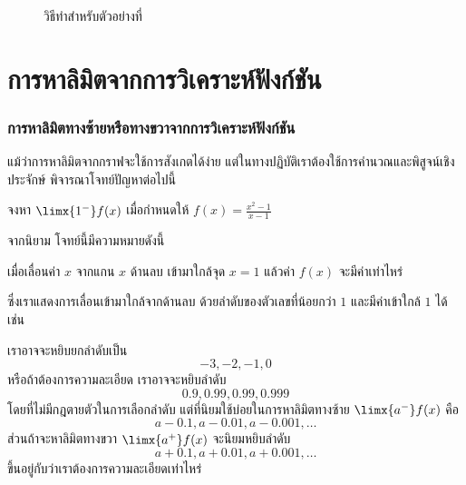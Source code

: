 \begin{frame}
\begin{figure}[h!]
\caption{วิธีทำสำหรับตัวอย่างที่ \theex}
\label{fig:limit_graph_ex3_sol}
\end{figure}
\end{frame}

\section[ลิมิตจากฟังก์ชัน]{การหาลิมิตจากการวิเคราะห์ฟังก์ชัน}
\frame{\sectionpage}

\begin{frame}[t]
\frametitle{การหาลิมิตทางซ้ายหรือทางขวาจากการวิเคราะห์ฟังก์ชัน}
แม้ว่าการหาลิมิตจากกราฟจะใช้การสังเกตได้ง่าย แต่ในทางปฏิบัติเราต้องใช้การคำนวณและพิสูจน์เชิงประจักษ์ พิจารณาโจทย์ปัญหาต่อไปนี้
\begin{remark}{}
\begin{center}
จงหา $\limx{1^{-}} f(x)$ เมื่อกำหนดให้ $f(x) = \frac{x^2-1}{x-1}$
\end{center}
\end{remark}

\begin{slide}
จากนิยาม โจทย์นี้มีความหมายดังนี้
\begin{remark}{}
\begin{center}
เมื่อเลื่อนค่า $x$ จากแกน $x$ ด้านลบ เข้ามาใกล้จุด $x=1$ แล้วค่า $f(x)$ จะมีค่าเท่าไหร่
\end{center}
\end{remark}
\end{slide}
\end{frame}

\begin{frame}[t]
ซึ่งเราแสดงการเลื่อนเข้ามาใกล้จากด้านลบ ด้วยลำดับของตัวเลขที่น้อยกว่า $1$ และมีค่าเข้าใกล้ $1$ ได้ เช่น
\begin{slide}
เราอาจจะหยิบยกลำดับเป็น
\[-3, -2,-1,0\]
หรือถ้าต้องการความละเอียด เราอาจจะหยิบลำดับ
\[0.9, 0.99, 0.99, 0.999\]
โดยที่ไม่มีกฎตายตัวในการเลือกลำดับ แต่ที่นิยมใช้บ่อยในการหาลิมิตทางซ้าย $\limx{a^{-}} f(x)$ คือ
\[a - 0.1, a - 0.01, a - 0.001, \ldots\]
ส่วนถ้าจะหาลิมิตทางขวา $\limx{a^{+}}f(x)$ จะนิยมหยิบลำดับ
\[a + 0.1, a + 0.01, a + 0.001, \ldots\]
ขึ้นอยู่กับว่าเราต้องการความละเอียดเท่าไหร่
\end{slide}
\end{frame}

